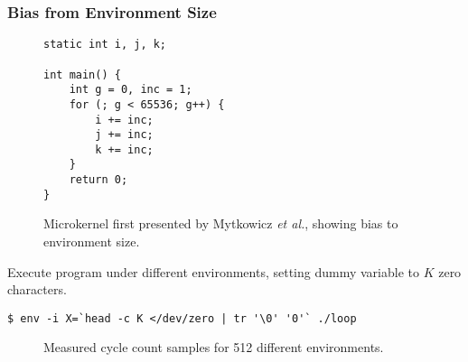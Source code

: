 \documentclass{beamer}
\begin{document}
\begin{frame}
\frametitle{Bias from Environment Size}

\begin{figure}
  \begin{lstlisting}[frame=single, xleftmargin=.01\textwidth, xrightmargin=.01\textwidth, aboveskip=-2pt]
static int i, j, k;

int main() {
    int g = 0, inc = 1;
    for (; g < 65536; g++) {
        i += inc;
        j += inc;
        k += inc;
    }
    return 0;
}
  \end{lstlisting}
  \caption{\label{fig:microkernel}Microkernel first presented by Mytkowicz \emph{et al.}\cite{Mytkowicz:2009:WrongData}, showing bias to environment size.}
\end{figure}


Execute program under different environments, setting dummy variable to $K$ zero characters.

\begin{lstlisting}[breaklines=true, belowskip=-10pt, basicstyle=\ttfamily\small]
$ env -i X=`head -c K </dev/zero | tr '\0' '0'` ./loop
\end{lstlisting}

\begin{figure}
  \caption{Measured cycle count samples for 512 different environments.}
\end{figure}


\end{frame}
\end{document}
